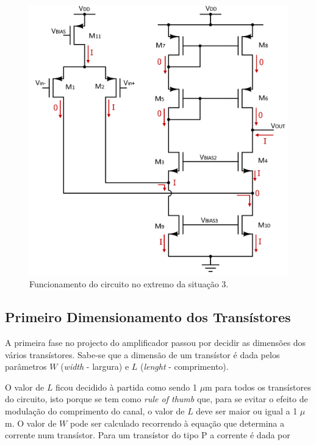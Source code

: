\documentclass[11pt]{article}
\numberwithin{equation}{section}
\begin{document}
\begin{figure}[H]
	\centering
	\includegraphics[keepaspectratio=true, scale=0.50]{teoricas/situacao3}
	\vspace{-0.5em}
	\caption{Funcionamento do circuito no extremo da situação 3.}
	\vspace{-0.8em}
\end{figure} 

\subsection{Primeiro Dimensionamento dos Transístores}

A primeira fase no projecto do amplificador passou por decidir as dimensões dos vários transístores. Sabe-se que a dimensão de um transístor é dada pelos parâmetros $W$ (\textit{width} - largura) e $L$ (\textit{lenght} - comprimento). 

O valor de $L$ ficou decidido à partida como sendo 1 $\mu$m para todos os transístores do circuito, isto porque se tem como \textit{rule of thumb} que, para se evitar o efeito de modulação do comprimento do canal, o valor de $L$ deve ser maior ou igual a 1 $\mu$m. O valor de $W$ pode ser calculado recorrendo à equação que determina a corrente num transístor. Para um transístor do tipo P a corrente é dada por
\end{document}
